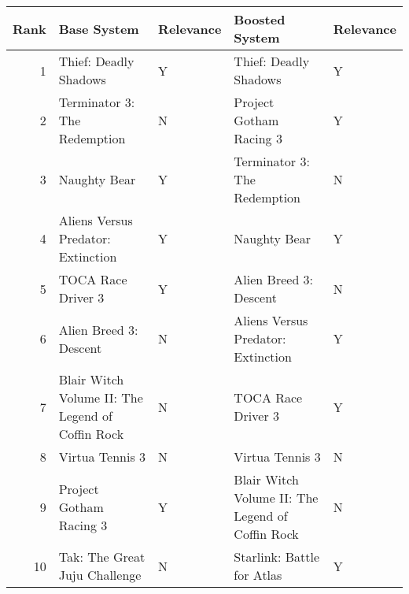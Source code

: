 \begin{tabular}{rllll}
\toprule
Rank & Base System & Relevance & Boosted System & Relevance \\
\midrule
1 & Thief: Deadly Shadows & Y & Thief: Deadly Shadows & Y \\
2 & Terminator 3: The Redemption & N & Project Gotham Racing 3 & Y \\
3 & Naughty Bear & Y & Terminator 3: The Redemption & N \\
4 & Aliens Versus Predator: Extinction & Y & Naughty Bear & Y \\
5 & TOCA Race Driver 3 & Y & Alien Breed 3: Descent & N \\
6 & Alien Breed 3: Descent & N & Aliens Versus Predator: Extinction & Y \\
7 & Blair Witch Volume II: The Legend of Coffin Rock & N & TOCA Race Driver 3 & Y \\
8 & Virtua Tennis 3 & N & Virtua Tennis 3 & N \\
9 & Project Gotham Racing 3 & Y & Blair Witch Volume II: The Legend of Coffin Rock & N \\
10 & Tak: The Great Juju Challenge & N & Starlink: Battle for Atlas & Y \\
\bottomrule
\end{tabular}
